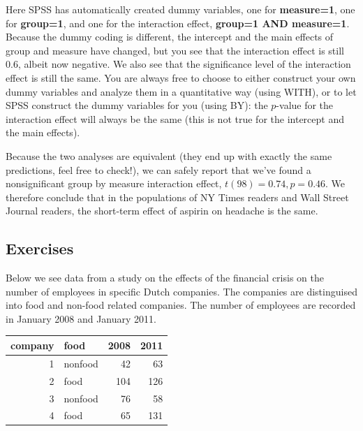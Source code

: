 \documentclass[]{report}\usepackage[]{graphicx}\usepackage[]{color}
\newenvironment{knitrout}{}{} %
\begin{document}
Here SPSS has automatically created dummy variables, one for \textbf{measure=1}, one for \textbf{group=1}, and one for the interaction effect, \textbf{group=1 AND measure=1}. Because the dummy coding is different, the intercept and the main effects of group and measure have changed, but you see that the interaction effect is still 0.6, albeit now negative. We also see that the significance level of the interaction effect is still the same. You are always free to choose to either construct your own dummy variables and analyze them in a quantitative way (using WITH), or to let SPSS construct the dummy variables for you (using BY): the $p$-value for the interaction effect will always be the same (this is not true for the intercept and the main effects).

Because the two analyses are equivalent (they end up with exactly the same predictions, feel free to check!), we can safely report that we've found a nonsignificant group by measure interaction effect, $t(98)=0.74, p=0.46$. We therefore conclude that in the populations of NY Times readers and Wall Street Journal readers, the short-term effect of aspirin on headache is the same. 



\subsection{Exercises}

Below we see data from a study on the effects of the financial crisis on the number of employees in specific Dutch companies. The companies are distinguised into food and non-food related companies. The number of employees are recorded in January 2008 and January 2011.

\begin{knitrout}
\color{fgcolor}
\begin{tabular}{r|l|r|r}
\hline
company & food & 2008 & 2011\\
\hline
1 & nonfood & 42 & 63\\
\hline
2 & food & 104 & 126\\
\hline
3 & nonfood & 76 & 58\\
\hline
4 & food & 65 & 131\\
\hline
\end{tabular}


\end{knitrout}
\end{document}
